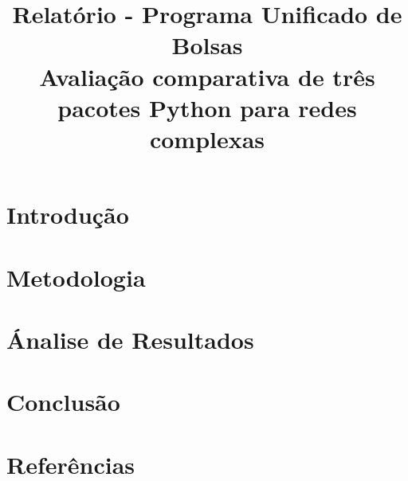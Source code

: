 \documentclass[a4paper]{article}
\title{
  \huge {Relatório - Programa Unificado de Bolsas}
  \\
  \Huge {Avaliação comparativa de três pacotes Python para redes complexas}
}
\begin{document}
\maketitle

\tableofcontents
\clearpage
\section{Introdução}

\section{Metodologia}

\section{Ánalise de Resultados}

\section{Conclusão}
\section{Referências}
\end{document}
